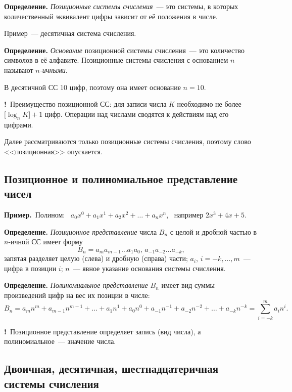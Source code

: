 \documentclass[a4paper,11pt]{article}
\newcommand{\imp}{\textbf{\color{red!70!black}!}\ }
\newcommand{\prim}{\textbf{Пример.}\ }
\begin{document}
\begin{opr}
\textbf{Определение.} \emph{Позиционные системы счисления}~--- это системы, в которых
количественный эквивалент цифры зависит от её положения в числе.
\end{opr}
Пример~--- десятичная система счисления.

\begin{opr}
\textbf{Определение.} \emph{Основание} позиционной системы счисления~--- это количество символов в её
алфавите. Позиционные системы счисления с основанием $n$ называют \emph{$n$-ичными}.
\end{opr}
В десятичной СС 10 цифр, поэтому она имеет основание $n = 10$.

\imp Преимущество позиционной СС: для записи числа $K$ необходимо не более $\bigl[\log_n K\bigr] + 1$
цифр. Операции над числами сводятся к действиям над его цифрами.

Далее рассматриваются только позиционные системы счисления, поэтому слово <<позиционная>> опускается.

\subsection{Позиционное и полиномиальное представление чисел}

\prim Полином: \ $a_0 x^0 + a_1 x^1 + a_2 x^2 + \dots + a_n x^n$, \ например $2x^3 + 4x + 5$.

\begin{opr}
\textbf{Определение.} \emph{Позиционное представление} числа $B_n$ с целой и дробной частью
в $n$-ичной СС имеет форму
\[
  B_n = a_m a_{m-1} \dots a_1 a_0,\, a_{-1} a_{-2} \dots a_{-k},
\]
запятая разделяет целую (слева) и дробную (справа) части; $a_i$, $i = -k, \dots, m$~--- цифра
в позиции $i$; $n$~--- явное указание основания системы счисления.
\end{opr}

\begin{opr}
\textbf{Определение.} \emph{Полиномиальное представление} $B_n$ имеет вид суммы произведений цифр
на вес их позиции в числе:
\[
  B_n = a_m n^m + a_{m-1} n^{m-1} + \dots + a_1 n^1 + a_0 n^0 + a_{-1} n^{-1} + a_{-2} n^{-2}
        + \dots + a_{-k} n^{-k} = \sum_{i=-k}^{m} a_i n^i. \tag{4.1}
\]
\end{opr}

\imp Позиционное представление определяет запись (вид числа), а полиномиальное~--- значение числа.

\subsection{Двоичная, десятичная, шестнадцатеричная системы счисления}
\end{document}
